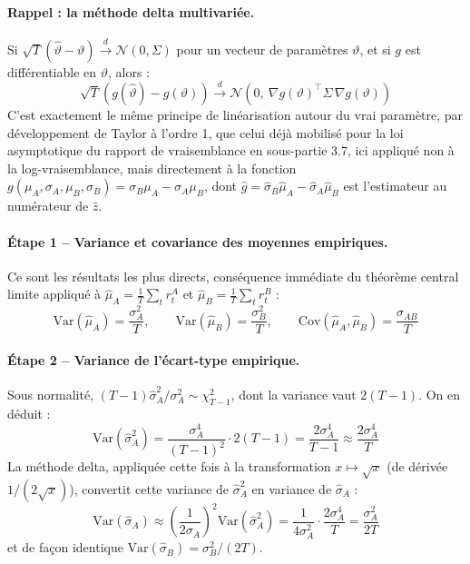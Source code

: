 \documentclass{article}
\begin{document}
\paragraph{Rappel : la méthode delta multivariée.} Si $\sqrt{T}(\hat\vartheta-\vartheta) \xrightarrow{d} \mathcal{N}(0,\Sigma)$ pour un vecteur de paramètres $\vartheta$, et si $g$ est différentiable en $\vartheta$, alors :
\begin{equation}
\sqrt{T}\left(g(\hat\vartheta)-g(\vartheta)\right) \xrightarrow{d} \mathcal{N}\!\left(0,\ \nabla g(\vartheta)^\top \Sigma\, \nabla g(\vartheta)\right)
\end{equation}
C'est exactement le même principe de linéarisation autour du vrai paramètre, par développement de Taylor à l'ordre 1, que celui déjà mobilisé pour la loi asymptotique du rapport de vraisemblance en sous-partie 3.7, ici appliqué non à la log-vraisemblance, mais directement à la fonction $g(\mu_A,\sigma_A,\mu_B,\sigma_B) = \sigma_B\mu_A - \sigma_A\mu_B$, dont $\hat g = \hat\sigma_B\hat\mu_A-\hat\sigma_A\hat\mu_B$ est l'estimateur au numérateur de $\hat z$.
\paragraph{Étape 1 -- Variance et covariance des moyennes empiriques.} Ce sont les résultats les plus directs, conséquence immédiate du théorème central limite appliqué à $\hat\mu_A=\frac{1}{T}\sum_t r_t^A$ et $\hat\mu_B=\frac{1}{T}\sum_t r_t^B$ :
\begin{equation}
\text{Var}(\hat\mu_A) = \frac{\sigma_A^2}{T}, \qquad \text{Var}(\hat\mu_B) = \frac{\sigma_B^2}{T}, \qquad \text{Cov}(\hat\mu_A,\hat\mu_B) = \frac{\sigma_{AB}}{T}
\end{equation}
\paragraph{Étape 2 -- Variance de l'écart-type empirique.} Sous normalité, $(T-1)\hat\sigma_A^2/\sigma_A^2 \sim \chi^2_{T-1}$, dont la variance vaut $2(T-1)$. On en déduit :
\begin{equation}
\text{Var}(\hat\sigma_A^2) = \frac{\sigma_A^4}{(T-1)^2}\cdot 2(T-1) = \frac{2\sigma_A^4}{T-1} \approx \frac{2\sigma_A^4}{T}
\end{equation}
La méthode delta, appliquée cette fois à la transformation $x\mapsto\sqrt{x}$ (de dérivée $1/(2\sqrt{x})$), convertit cette variance de $\hat\sigma_A^2$ en variance de $\hat\sigma_A$ :
\begin{equation}
\text{Var}(\hat\sigma_A) \approx \left(\frac{1}{2\sigma_A}\right)^2 \text{Var}(\hat\sigma_A^2) = \frac{1}{4\sigma_A^2}\cdot\frac{2\sigma_A^4}{T} = \frac{\sigma_A^2}{2T}
\end{equation}
et de façon identique $\text{Var}(\hat\sigma_B)=\sigma_B^2/(2T)$.
\end{document}
